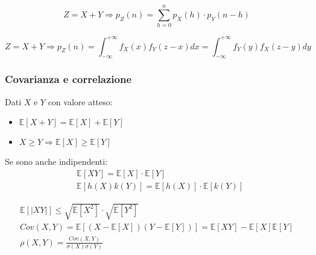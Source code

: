 \begin{proposition}
	\begin{equation}
		Z = X+Y \Longrightarrow p_Z(n) = \sum_{h=0}^{n}p_X(h) \cdot p_Y(n-h)
	\end{equation}
\end{proposition}

\begin{proposition}
	\begin{equation}
		Z = X+Y \Longrightarrow p_Z(n) = \int_{-\infty}^{+\infty} f_X(x)f_Y(z-x)dx = \int_{-\infty}^{+\infty} f_Y(y)f_X(z-y)dy
	\end{equation}
\end{proposition}

\subsubsection{Covarianza e correlazione}
\begin{proposition}
	Dati $X$ e $Y$ con valore atteso:
	\begin{itemize}
		\item $\mathbb{E}[X+Y] = \mathbb{E}[X] + \mathbb{E}[Y]$ \\
		\item $X \geq Y \Longrightarrow \mathbb{E}[X] \geq \mathbb{E}[Y]$
	\end{itemize}
	Se sono anche indipendenti:
	\begin{align}
		& \mathbb{E}[XY] = \mathbb{E}[X] \cdot \mathbb{E}[Y] \\
		& \mathbb{E}[h(X)k(Y)] = \mathbb{E}[h(X)] \cdot \mathbb{E}[k(Y)] 
	\end{align}
\end{proposition}

\begin{align}
	\mathbb{E}[\lvert XY \rvert] \leq \sqrt{\mathbb{E}[X^2]} \cdot \sqrt{\mathbb{E}[Y^2]} \tag{Disuguaglianza di Schwartz}\\
	Cov(X,Y) = \mathbb{E}[(X - \mathbb{E}[X])(Y - \mathbb{E}[Y])] = \mathbb{E}[XY] - \mathbb{E}[X]\mathbb{E}[Y] \tag{Covarianza} \\
	\rho(X,Y) = \frac{Cov(X,Y)}{\sigma(X)\sigma(Y)} \tag{Coefficiente di correlazione}
\end{align}

\newpage
